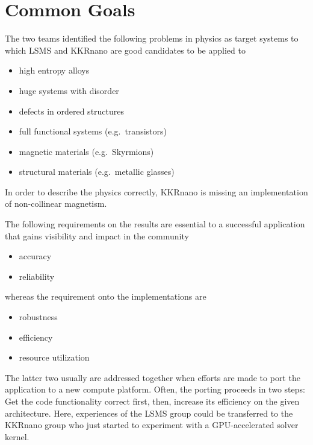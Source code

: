 \documentclass{llncs}
\def\KKRnano{{KKRnano}}
\def\LSMS{{LSMS}}
\begin{document}
\section{Common Goals} \label{section:common}

The two teams identified the following problems in physics as target systems to which \LSMS{} and \KKRnano{}
are good candidates to be applied to
\begin{itemize}
 \item high entropy alloys
 \item huge systems with disorder
 \item defects in ordered structures
 \item full functional systems (e.g.~transistors)
 \item magnetic materials (e.g.~Skyrmions)
 \item structural materials (e.g.~metallic glasses)
\end{itemize}

In order to describe the physics correctly, \KKRnano{} is missing an implementation of non-collinear magnetism.


The following requirements on the results are essential to a successful application that gains visibility and impact in the community
\begin{itemize}
 \item accuracy
 \item reliability
\end{itemize}
whereas the requirement onto the implementations are
\begin{itemize}
 \item robustness
 \item efficiency
 \item resource utilization 
\end{itemize}
The latter two usually are addressed together when efforts are made to port the application to a new compute platform.
Often, the porting proceeds in two steps: Get the code functionality correct first, then, increase its efficiency on
the given architecture. Here, experiences of the \LSMS{} group could be transferred to the \KKRnano{} group who just
started to experiment with a GPU-accelerated solver kernel.
\end{document}
